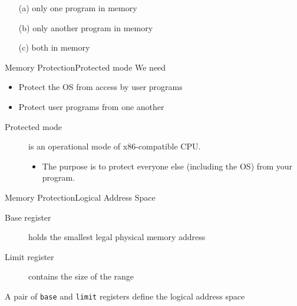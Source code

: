 \begin{enumerate}
\item[(a)] only one program in memory
\item[(b)] only another program in memory
\item[(c)] both in memory
\end{enumerate}

\begin{frame}{Memory Protection}{Protected mode}
  We need
  \begin{itemize}
  \item Protect the OS from access by user programs
  \item Protect user programs from one another
  \end{itemize}
  \begin{description}
  \item[Protected mode] is an operational mode of x86-compatible CPU.
    \begin{itemize}
    \item The purpose is to protect everyone else (including the OS) from your program.
    \end{itemize}
  \end{description}
\end{frame}

\begin{frame}{Memory Protection}{Logical Address Space}
  \begin{description}
  \item[Base register] holds the smallest legal physical memory address
  \item[Limit register] contains the size of the range
  \end{description}
  \begin{minipage}{.4\textwidth}
    \centering
  \end{minipage}\quad
  \begin{minipage}{.55\textwidth}
    A pair of \texttt{base} and \texttt{limit} registers define the logical address space
    \begin{center}
    \end{center}
    \begin{center}
      {}
    \end{center}
    \begin{center}
    \end{center}
  \end{minipage}
\end{frame}

